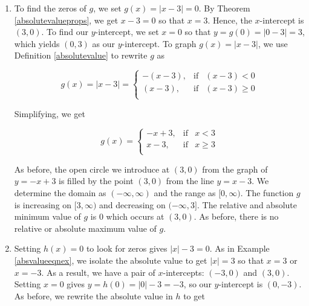 {\begin{enumerate}
By projecting the graph to the $x$-axis, we see that the domain is $(-\infty, \infty)$.  Projecting to the $y$-axis gives us the range $[0,\infty)$.  The function is increasing on $[0,\infty)$ and decreasing on $(-\infty,0]$.  The relative minimum value of $f$ is the same as the absolute minimum, namely $0$ which occurs at $(0,0)$.  There is no relative maximum value of $f$.  There is also no absolute maximum value of $f$, since the $y$ values on the graph extend infinitely upwards.

\item  To find the zeros of $g$, we set $g(x) = |x-3|=0$.  By Theorem \ref{absolutevalueprops}, we get $x-3=0$ so that $x=3$.  Hence, the $x$-intercept is $(3,0)$.  To find our $y$-intercept, we set $x=0$ so that $y = g(0) = |0-3| = 3$, which yields $(0,3)$ as our $y$-intercept.  To graph $g(x) = |x-3|$, we use Definition \ref{absolutevalue} to rewrite $g$ as

\[ g(x) = |x-3| =  \left\{ \begin{array}{rcl} -(x-3), & \mbox{if} & (x-3) < 0  \\ (x-3), & \mbox{if} & (x -3) \geq 0 \\ \end{array} \right.\]

Simplifying, we get

\[ g(x) =\left\{ \begin{array}{rcl} -x+3, & \mbox{if} & x<3  \\ x-3, & \mbox{if} & x \geq 3 \\ \end{array} \right.\]




As before, the open circle we introduce at $(3,0)$ from the graph of $y = -x+3$ is filled by the point $(3,0)$ from the line $y = x-3$. We determine the domain as $(-\infty, \infty)$ and the range as $[0,\infty)$.  The function $g$ is increasing on $[3,\infty)$ and decreasing on $(-\infty,3]$.  The relative and absolute minimum value of $g$ is $0$ which occurs at $(3,0)$.  As before, there is no relative or absolute maximum value of $g$.

\item  Setting $h(x) = 0$ to look for zeros gives $|x|-3=0$. As in Example \ref{absvalueeqnex},  we isolate the absolute value to get  $|x| = 3$ so that $x =3$ or $x=-3$.  As a result, we have a pair of $x$-intercepts:  $(-3,0)$ and $(3,0)$.  Setting $x=0$ gives $y = h(0) = |0|-3 = -3$, so our $y$-intercept is $(0,-3)$.  As before, we rewrite the absolute value in $h$ to get


\end{enumerate}}
